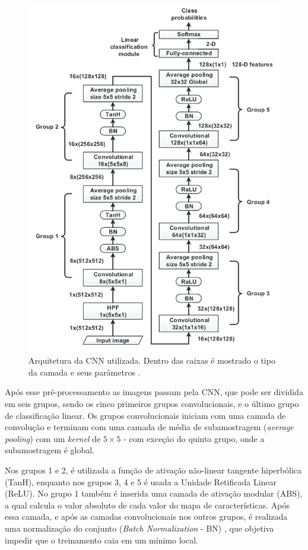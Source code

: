 \begin{figure}[!htb]
	\centering
    \includegraphics[width=.8\textwidth]{dados/figuras/cnn_model.png}
    \caption{Arquitetura da CNN utilizada. Dentro das caixas é mostrado o tipo da camada e seus parâmetros \cite{cnn_base}.}
    \label{fig:cnn_model}
\end{figure}
 
Após esse pré-processamento as imagens passam pela CNN, que pode ser dividida em seis grupos, sendo os cinco primeiros grupos convolucionais, e o último grupo de classificação linear. Os grupos convolucionais iniciam com uma camada de convolução e terminam com uma camada de média de subamostragem (\textit{average pooling}) com um \textit{kernel} de $5\times 5$ - com exceção do quinto grupo, onde a subamostragem é global.
 
Nos grupos 1 e 2, é utilizada a função de ativação não-linear tangente hiperbólica (TanH), enquanto nos grupos 3, 4 e 5 é usada a Unidade Retificada Linear (ReLU). No grupo 1 também é inserida uma camada de ativação modular (ABS), a qual calcula o valor absoluto de cada valor do mapa de características. Após essa camada, e após as camadas convolucionais nos outros grupos, é realizada uma normalização do conjunto (\textit{Batch Normalization} - BN) \cite{batch_normalization}, que objetiva impedir que o treinamento caia em um mínimo local.
 
